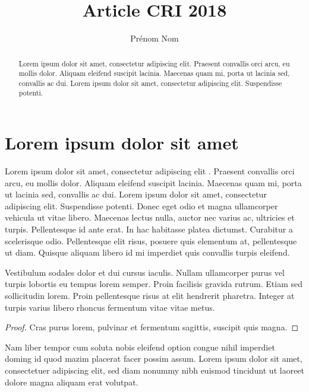 \documentclass[a4paper,french]{style-LaTeX} %
\title{Article CRI 2018} %
\author[1]{Prénom Nom} %
\affil[1]{Aix-Marseille Université, France, 
\texttt{prenom.nom@etu.univ-amu.fr}} %
\begin{document}
\maketitle %

\begin{abstract}
  Lorem ipsum dolor sit amet, consectetur adipiscing elit. Praesent
  convallis orci arcu, eu mollis dolor. Aliquam eleifend suscipit
  lacinia. Maecenas quam mi, porta ut lacinia sed, convallis ac dui.
  Lorem ipsum dolor sit amet, consectetur adipiscing elit. Suspendisse
  potenti.
\end{abstract}


\section{Lorem ipsum dolor sit amet}

Lorem ipsum dolor sit amet, consectetur adipiscing elit
\cite{DBLP:journals/cacm/Knuth74}. Praesent convallis orci arcu, eu
mollis dolor. Aliquam eleifend suscipit lacinia. Maecenas quam mi,
porta ut lacinia sed, convallis ac dui. Lorem ipsum dolor sit amet,
consectetur adipiscing elit. Suspendisse potenti. Donec eget odio et
magna ullamcorper vehicula ut vitae libero. Maecenas lectus nulla,
auctor nec varius ac, ultricies et turpis. Pellentesque id ante erat.
In hac habitasse platea dictumst. Curabitur a scelerisque odio.
Pellentesque elit risus, posuere quis elementum at, pellentesque ut
diam. Quisque aliquam libero id mi imperdiet quis convallis turpis
eleifend.

\begin{lemma} \label{lemma:lorem} Vestibulum sodales
dolor et dui cursus iaculis. Nullam ullamcorper purus vel turpis
lobortis eu tempus lorem semper. Proin facilisis gravida rutrum. Etiam
sed sollicitudin lorem. Proin pellentesque risus at elit hendrerit
pharetra. Integer at turpis varius libero rhoncus fermentum vitae
vitae metus. 
\end{lemma}

\begin{proof} 
Cras purus lorem, pulvinar et fermentum sagittis,
suscipit quis magna. 
\end{proof}

\begin{theorem}
\label{theorem:curabitur} Nam liber tempor cum soluta nobis eleifend
option congue nihil imperdiet doming id quod mazim placerat facer
possim assum. Lorem ipsum dolor sit amet, consectetuer adipiscing
elit, sed diam nonummy nibh euismod tincidunt ut laoreet dolore magna
aliquam erat volutpat. 
\end{theorem}
\end{document}
